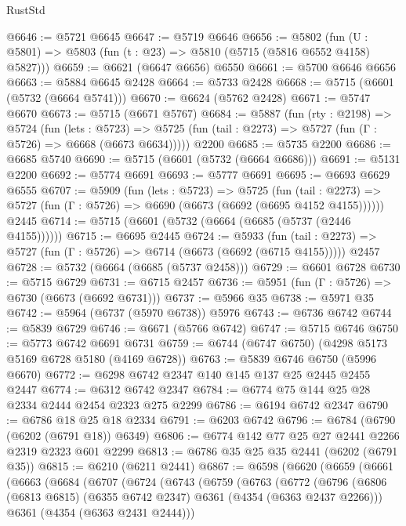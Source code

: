 \begin{lexlean}{RustStd}
\begin{coremodule}
@6646 := @5721 @6645
@6647 := @5719 @6646
@6656 := @5802 (fun (U : @5801) => @5803 (fun (t : @23) => @5810 (@5715 (@5816 @6552 @4158) @5827)))
@6659 := @6621 (@6647 @6656) @6550
@6661 := @5700 @6646 @6656
@6663 := @5884 @6645 @2428
@6664 := @5733 @2428
@6668 := @5715 (@6601 (@5732 (@6664 @5741)))
@6670 := @6624 (@5762 @2428)
@6671 := @5747 @6670
@6673 := @5715 (@6671 @5767)
@6684 := @5887
    (fun (rty : @2198) =>
    @5724
      (fun (lets : @5723) =>
      @5725 (fun (tail : @2273) => @5727 (fun (Γ : @5726) => @6668 (@6673 @6634)))))
    @2200
@6685 := @5735 @2200
@6686 := @6685 @5740
@6690 := @5715 (@6601 (@5732 (@6664 @6686)))
@6691 := @5131 @2200
@6692 := @5774 @6691
@6693 := @5777 @6691
@6695 := @6693 @6629 @6555
@6707 := @5909
    (fun (lets : @5723) =>
    @5725
      (fun (tail : @2273) => @5727 (fun (Γ : @5726) => @6690 (@6673 (@6692 (@6695 @4152 @4155))))))
    @2445
@6714 := @5715 (@6601 (@5732 (@6664 (@6685 (@5737 (@2446 @4155))))))
@6715 := @6695 @2445
@6724 := @5933
    (fun (tail : @2273) => @5727 (fun (Γ : @5726) => @6714 (@6673 (@6692 (@6715 @4155)))))
    @2457
@6728 := @5732 (@6664 (@6685 (@5737 @2458)))
@6729 := @6601 @6728
@6730 := @5715 @6729
@6731 := @6715 @2457
@6736 := @5951 (fun (Γ : @5726) => @6730 (@6673 (@6692 @6731)))
@6737 := @5966 @35
@6738 := @5971 @35
@6742 := @5964 (@6737 (@5970 @6738)) @5976
@6743 := @6736 @6742
@6744 := @5839 @6729
@6746 := @6671 (@5766 @6742)
@6747 := @5715 @6746
@6750 := @5773 @6742 @6691 @6731
@6759 := @6744 (@6747 @6750) (@4298 @5173 @5169 @6728 @5180 (@4169 @6728))
@6763 := @5839 @6746 @6750 (@5996 @6670)
@6772 := @6298 @6742 @2347 @140 @145 @137 @25 @2445 @2455 @2447
@6774 := @6312 @6742 @2347
@6784 := @6774 @75 @144 @25 @28 @2334 @2444 @2454 @2323 @275 @2299
@6786 := @6194 @6742 @2347
@6790 := @6786 @18 @25 @18 @2334
@6791 := @6203 @6742
@6796 := @6784 (@6790 (@6202 (@6791 @18)) @6349)
@6806 := @6774 @142 @77 @25 @27 @2441 @2266 @2319 @2323 @601 @2299
@6813 := @6786 @35 @25 @35 @2441 (@6202 (@6791 @35))
@6815 := @6210 (@6211 @2441)
@6867 := @6598
    (@6620
      (@6659
        (@6661
          (@6663
            (@6684
              (@6707
                (@6724
                  (@6743
                    (@6759
                      (@6763
                        (@6772
                          (@6796
                            (@6806
                              (@6813 @6815)
                              (@6355 @6742 @2347)
                              @6361
                              (@4354 (@6363 @2437 @2266)))
                            @6361
                            (@4354 (@6363 @2431 @2444)))

\end{coremodule}
\end{lexlean}
